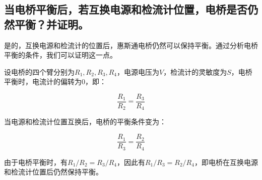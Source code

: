 \documentclass{ctexart}
\begin{document}
\subsection{当电桥平衡后，若互换电源和检流计位置，电桥是否仍然平衡？并证明。}

是的，互换电源和检流计的位置后，惠斯通电桥仍然可以保持平衡。通过分析电桥平衡的条件，我们可以证明这一点。

设电桥的四个臂分别为$R_1, R_2, R_3, R_4$，电源电压为$V$，检流计的灵敏度为$S$，电桥平衡时，电流计的偏转为0，即：

\begin{equation}
    \frac{R_1}{R_2} = \frac{R_3}{R_4}
\end{equation}

当电源和检流计位置互换后，电桥的平衡条件变为：

\begin{equation}
    \frac{R_1}{R_3} = \frac{R_2}{R_4}
\end{equation}

由于电桥平衡时，有$R_1/R_2 = R_3/R_4$，因此有$R_1/R_3 = R_2/R_4$，即电桥在互换电源和检流计位置后仍然保持平衡。
\end{document}
